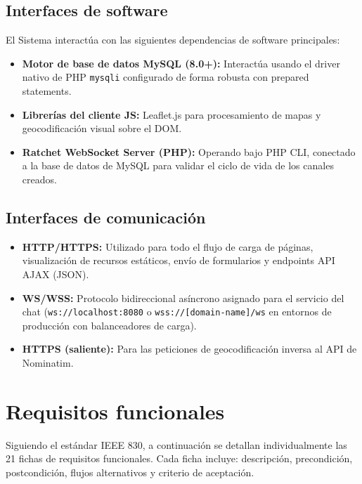 \documentclass[11pt,a4paper]{report}
\begin{document}
\subsection{Interfaces de software}
El Sistema interactúa con las siguientes dependencias de software principales:
\begin{itemize}
    \item \textbf{Motor de base de datos MySQL (8.0+):} Interactúa usando el driver nativo de PHP \texttt{mysqli} configurado de forma robusta con prepared statements.
    \item \textbf{Librerías del cliente JS:} Leaflet.js para procesamiento de mapas y geocodificación visual sobre el DOM.
    \item \textbf{Ratchet WebSocket Server (PHP):} Operando bajo PHP CLI, conectado a la base de datos de MySQL para validar el ciclo de vida de los canales creados.
\end{itemize}

\subsection{Interfaces de comunicación}
\begin{itemize}
    \item \textbf{HTTP/HTTPS:} Utilizado para todo el flujo de carga de páginas, visualización de recursos estáticos, envío de formularios y endpoints API AJAX (JSON).
    \item \textbf{WS/WSS:} Protocolo bidireccional asíncrono asignado para el servicio del chat (\texttt{ws://localhost:8080} o \texttt{wss://[domain-name]/ws} en entornos de producción con balanceadores de carga).
    \item \textbf{HTTPS (saliente):} Para las peticiones de geocodificación inversa al API de Nominatim.
\end{itemize}

\newpage
\section{Requisitos funcionales}

Siguiendo el estándar IEEE 830, a continuación se detallan individualmente las 21 fichas de requisitos funcionales. Cada ficha incluye: descripción, precondición, postcondición, flujos alternativos y criterio de aceptación.
\end{document}
